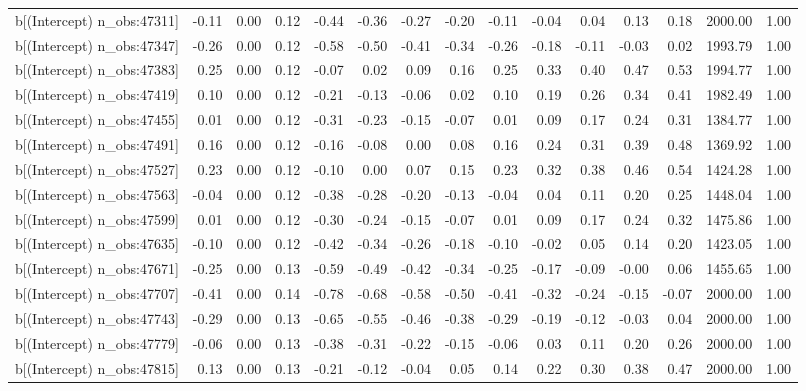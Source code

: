 \begin{table}[ht]
\begin{tabular}{rrrrrrrrrrrrrrr}
  b[(Intercept) n\_obs:47311] & -0.11 & 0.00 & 0.12 & -0.44 & -0.36 & -0.27 & -0.20 & -0.11 & -0.04 & 0.04 & 0.13 & 0.18 & 2000.00 & 1.00 \\ 
  b[(Intercept) n\_obs:47347] & -0.26 & 0.00 & 0.12 & -0.58 & -0.50 & -0.41 & -0.34 & -0.26 & -0.18 & -0.11 & -0.03 & 0.02 & 1993.79 & 1.00 \\ 
  b[(Intercept) n\_obs:47383] & 0.25 & 0.00 & 0.12 & -0.07 & 0.02 & 0.09 & 0.16 & 0.25 & 0.33 & 0.40 & 0.47 & 0.53 & 1994.77 & 1.00 \\ 
  b[(Intercept) n\_obs:47419] & 0.10 & 0.00 & 0.12 & -0.21 & -0.13 & -0.06 & 0.02 & 0.10 & 0.19 & 0.26 & 0.34 & 0.41 & 1982.49 & 1.00 \\ 
  b[(Intercept) n\_obs:47455] & 0.01 & 0.00 & 0.12 & -0.31 & -0.23 & -0.15 & -0.07 & 0.01 & 0.09 & 0.17 & 0.24 & 0.31 & 1384.77 & 1.00 \\ 
  b[(Intercept) n\_obs:47491] & 0.16 & 0.00 & 0.12 & -0.16 & -0.08 & 0.00 & 0.08 & 0.16 & 0.24 & 0.31 & 0.39 & 0.48 & 1369.92 & 1.00 \\ 
  b[(Intercept) n\_obs:47527] & 0.23 & 0.00 & 0.12 & -0.10 & 0.00 & 0.07 & 0.15 & 0.23 & 0.32 & 0.38 & 0.46 & 0.54 & 1424.28 & 1.00 \\ 
  b[(Intercept) n\_obs:47563] & -0.04 & 0.00 & 0.12 & -0.38 & -0.28 & -0.20 & -0.13 & -0.04 & 0.04 & 0.11 & 0.20 & 0.25 & 1448.04 & 1.00 \\ 
  b[(Intercept) n\_obs:47599] & 0.01 & 0.00 & 0.12 & -0.30 & -0.24 & -0.15 & -0.07 & 0.01 & 0.09 & 0.17 & 0.24 & 0.32 & 1475.86 & 1.00 \\ 
  b[(Intercept) n\_obs:47635] & -0.10 & 0.00 & 0.12 & -0.42 & -0.34 & -0.26 & -0.18 & -0.10 & -0.02 & 0.05 & 0.14 & 0.20 & 1423.05 & 1.00 \\ 
  b[(Intercept) n\_obs:47671] & -0.25 & 0.00 & 0.13 & -0.59 & -0.49 & -0.42 & -0.34 & -0.25 & -0.17 & -0.09 & -0.00 & 0.06 & 1455.65 & 1.00 \\ 
  b[(Intercept) n\_obs:47707] & -0.41 & 0.00 & 0.14 & -0.78 & -0.68 & -0.58 & -0.50 & -0.41 & -0.32 & -0.24 & -0.15 & -0.07 & 2000.00 & 1.00 \\ 
  b[(Intercept) n\_obs:47743] & -0.29 & 0.00 & 0.13 & -0.65 & -0.55 & -0.46 & -0.38 & -0.29 & -0.19 & -0.12 & -0.03 & 0.04 & 2000.00 & 1.00 \\ 
  b[(Intercept) n\_obs:47779] & -0.06 & 0.00 & 0.13 & -0.38 & -0.31 & -0.22 & -0.15 & -0.06 & 0.03 & 0.11 & 0.20 & 0.26 & 2000.00 & 1.00 \\ 
  b[(Intercept) n\_obs:47815] & 0.13 & 0.00 & 0.13 & -0.21 & -0.12 & -0.04 & 0.05 & 0.14 & 0.22 & 0.30 & 0.38 & 0.47 & 2000.00 & 1.00 \\ 

\end{tabular}
\end{table}
